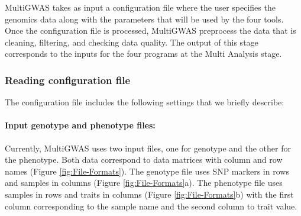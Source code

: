 \documentclass{article}
\begin{document}

MultiGWAS takes as input a configuration file where the user specifies the genomics data along with the parameters that will be used by the four tools. Once the configuration file is processed, MultiGWAS preprocess the data that is cleaning, filtering, and checking data quality. The output of this stage corresponds to the inputs for the four programs at the Multi Analysis stage.


\subsubsection{Reading configuration file}
The configuration file includes the following settings that we briefly describe:

\paragraph{Input genotype and phenotype files:}
Currently, MultiGWAS uses two input files, one for genotype and the other for the phenotype. Both data correspond to data matrices with column and row names (Figure \ref{fig:File-Formats}). The genotype file uses SNP markers in rows and samples in columns (Figure \ref{fig:File-Formats}a). The phenotype file uses samples in rows and traits in columns (Figure \ref{fig:File-Formats}b) with the first column corresponding to the sample name and the second column to trait value.

\end{document}
